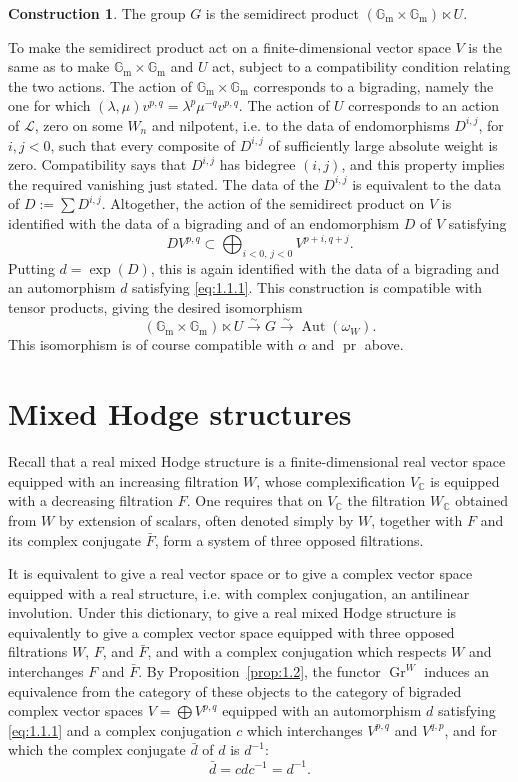 \documentclass[12pt,a4paper]{article}
\theoremstyle{plain}
\theoremstyle{definition}
\newtheorem{construction}[lemma]{Construction}
\DeclareMathOperator{\Gr}{Gr}
\DeclareMathOperator{\Aut}{Aut}
\DeclareMathOperator{\pr}{pr}
\newcommand{\Gm}{\mathbb{G}_\mathrm{m}}
\newcommand{\C}{\mathbb{C}}
\begin{document}
\begin{construction}\label{constr:1.6}
The group $G$ is the semidirect product $(\Gm\times\Gm)\ltimes U$.
\end{construction}

To make the semidirect product act on a finite-dimensional vector space $V$ is the same as to make $\Gm\times\Gm$ and $U$ act, subject to a compatibility condition relating the two actions. The action of $\Gm\times\Gm$ corresponds to a bigrading, namely the one for which $(\lambda,\mu)v^{p,q}=\lambda^p\mu^{-q}v^{p,q}$. The action of $U$ corresponds to an action of $\mathcal L$, zero on some $W_n$ and nilpotent, i.e. to the data of endomorphisms $D^{i,j}$, for $i,j<0$, such that every composite of $D^{i,j}$ of sufficiently large absolute weight is zero. Compatibility says that $D^{i,j}$ has bidegree $(i,j)$, and this property implies the required vanishing just stated. The data of the $D^{i,j}$ is equivalent to the data of $D:=\sum D^{i,j}$. Altogether, the action of the semidirect product on $V$ is identified with the data of a bigrading and of an endomorphism $D$ of $V$ satisfying
\[
DV^{p,q}\subset \bigoplus_{i<0,\,j<0}V^{p+i,q+j}.
\]
Putting $d=\exp(D)$, this is again identified with the data of a bigrading and an automorphism $d$ satisfying \eqref{eq:1.1.1}. This construction is compatible with tensor products, giving the desired isomorphism
\[
(\Gm\times\Gm)\ltimes U\xrightarrow{\sim}G\xrightarrow{\sim}\Aut(\omega_W).
\]
This isomorphism is of course compatible with $\alpha$ and $\pr$ above.

\section{Mixed Hodge structures}

Recall that a real mixed Hodge structure is a finite-dimensional real vector space equipped with an increasing filtration $W$, whose complexification $V_\C$ is equipped with a decreasing filtration $F$. One requires that on $V_\C$ the filtration $W_\C$ obtained from $W$ by extension of scalars, often denoted simply by $W$, together with $F$ and its complex conjugate $\bar F$, form a system of three opposed filtrations.

It is equivalent to give a real vector space or to give a complex vector space equipped with a real structure, i.e. with complex conjugation, an antilinear involution. Under this dictionary, to give a real mixed Hodge structure is equivalently to give a complex vector space equipped with three opposed filtrations $W$, $F$, and $\bar F$, and with a complex conjugation which respects $W$ and interchanges $F$ and $\bar F$. By Proposition~\ref{prop:1.2}, the functor $\Gr^W$ induces an equivalence from the category of these objects to the category of bigraded complex vector spaces $V=\bigoplus V^{p,q}$ equipped with an automorphism $d$ satisfying \eqref{eq:1.1.1} and a complex conjugation $c$ which interchanges $V^{p,q}$ and $V^{q,p}$, and for which the complex conjugate $\bar d$ of $d$ is $d^{-1}$:
\[
\bar d=cdc^{-1}=d^{-1}.
\]
\end{document}
